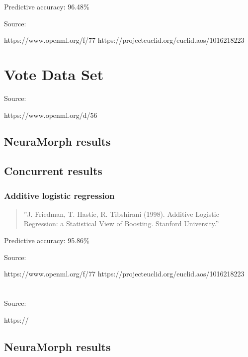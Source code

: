 \documentclass[8pt, a4paper]{article}
\begin{document}
Predictive accuracy: 96.48\%

Source:

https://www.openml.org/f/77
https://projecteuclid.org/euclid.aos/1016218223









\newpage
\section{Vote Data Set}

Source: 

https://www.openml.org/d/56

\subsection{NeuraMorph results}



\subsection{Concurrent results}

\subsubsection{Additive logistic regression}

\begin{quote}
''J. Friedman, T. Hastie, R. Tibshirani (1998). Additive Logistic Regression: a Statistical View of Boosting. Stanford University.''
\end{quote}

Predictive accuracy: 95.86\%

Source:

https://www.openml.org/f/77
https://projecteuclid.org/euclid.aos/1016218223









\newpage
\section{}

Source: 

https://

\subsection{NeuraMorph results}
\end{document}

